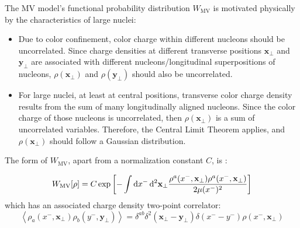 The \gls{MV} model's functional probability distribution $W_{\text{MV}}$ %
is motivated physically by the characteristics of large nuclei: \citep{Gelis_Habilitation}
\begin{itemize}
	\item[1)] Due to color confinement, color charge within different nucleons should be uncorrelated. Since charge densities at different transverse positions $\mathbf{x}_\perp$ and $\mathbf{y}_\perp$ are associated with different nucleons/longitudinal superpositions of nucleons, $\rho(\mathbf{x}_\perp)$ and $\rho(\mathbf{y}_\perp)$ should also be uncorrelated.
	\item[2)] For large nuclei, at least at central positions, transverse color charge density results from the sum of many longitudinally aligned nucleons. Since the color charge of those nucleons is uncorrelated, then $\rho(\mathbf{x}_\perp)$ is a sum of uncorrelated variables. Therefore, the Central Limit Theorem applies, and $\rho(\mathbf{x}_\perp)$ should follow a Gaussian distribution.
\end{itemize}

The form of $W_{\text{MV}}$, apart from a normalization constant $C$, is \citep{Albacete_2014} \textcolor{red}{\citep{Carrington_2022}}:

\begin{equation}
	W_\text{MV}[\rho] = C \exp \left[ - \int \mathop{}\!\mathrm{d} x^- \mathop{}\!\mathrm{d}^2 \mathbf{x}_\perp \frac{\rho^a(x^-,\mathbf{x_\perp})\rho^a(x^-,\mathbf{x_\perp})}{2 \mu(x^-)^2 } \right]
\end{equation}
which has an associated charge density two-point correlator:
\begin{equation}
	\left< \rho_a(x^-,\mathbf{x}_\perp) \rho_b (y^-,\mathbf{y}_\perp) \right> =  \delta^{ab} \delta^2 (\mathbf{x}_\perp - \mathbf{y}_\perp) \delta (x^- - y^-) \rho(x^-, \mathbf{x}_\perp)
	\label{eq:MV_charge_correlator}
\end{equation}


